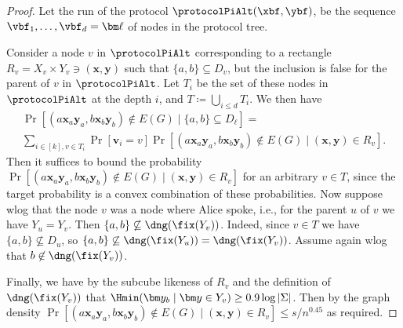 {}{
\begin{proof}
Let the run of the protocol $\protocolPiAlt(\xbf,\ybf)$, be the sequence $\vbf_1, \dots, \vbf_d = \bm \ell$ of nodes in the protocol tree. 


Consider a node $v$ in $\protocolPiAlt$ corresponding to a rectangle $R_v = X_v \times Y_v \ni (\bm x, \bm y)$ such that $\{a,b\} \subseteq D_v$, but the inclusion is false for the parent of $v$ in $\protocolPiAlt$. Let $T_{i}$ be the set of these nodes in $\protocolPiAlt$ at the depth $i$, and $T \coloneqq \bigcup_{i \le d} T_i$. We then have
 \begin{multline*}
\Pr[(a \bm x_a \bm y_a, b \bm x_b \bm y_b) \not\in E(G) \mid \{a,b\} \subseteq D_{\bm \ell}] = \\\sum_{i \in [k], v \in T_{i}} \Pr[\bm v_i = v] \Pr[(a \bm x_a \bm y_a, b \bm x_b \bm y_b) \not\in E(G) \mid (\bm x, \bm y) \in R_v].
 \end{multline*}
Then it suffices to bound the probability $\Pr[(a \bm x_a \bm y_a, b \bm x_b \bm y_b) \not\in E(G) \mid (\bm x, \bm y) \in R_v]$ for an arbitrary $v \in T$, since the target probability is a convex combination of these probabilities.
Now suppose wlog that the node $v$ was a node where Alice spoke, i.e., for the parent $u$ of $v$ we have $Y_u = Y_v$. Then $\{a,b\} \not\subseteq \dng(\fix(Y_v))$. Indeed, since $v \in T$ we have $\{a,b\} \not\subseteq D_u$, so $\{a,b\} \not\subseteq \dng(\fix(Y_u)) = \dng(\fix(Y_v))$. Assume again wlog that $b \not\in \dng(\fix(Y_v))$. 

Finally, we have by the subcube likeness of $R_v$ and the definition of $\dng(\fix(Y_v))$ that $\Hmin(\bm y_b \mid \bm y \in Y_v) \ge 0.9 \log |\Sigma|$. Then by the graph density $\Pr[(a \bm x_a \bm y_a, b \bm x_b \bm y_b) \not\in E(G) \mid (\bm x, \bm y) \in R_v] \le s/n^{0.45}$ as required. 
\end{proof}}


